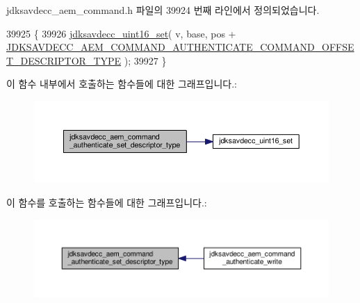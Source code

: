 jdksavdecc\+\_\+aem\+\_\+command.\+h 파일의 39924 번째 라인에서 정의되었습니다.


\begin{DoxyCode}
39925 \{
39926     \hyperlink{group__endian_ga14b9eeadc05f94334096c127c955a60b}{jdksavdecc\_uint16\_set}( v, base, pos + 
      \hyperlink{group__command__authenticate_gae59b6008707cccaab8f575f3e83dcea4}{JDKSAVDECC\_AEM\_COMMAND\_AUTHENTICATE\_COMMAND\_OFFSET\_DESCRIPTOR\_TYPE}
       );
39927 \}
\end{DoxyCode}


이 함수 내부에서 호출하는 함수들에 대한 그래프입니다.\+:
\nopagebreak
\begin{figure}[H]
\begin{center}
\leavevmode
\includegraphics[width=350pt]{group__command__authenticate_ga482382acdfff24eaf915502ce4d5ae75_cgraph}
\end{center}
\end{figure}




이 함수를 호출하는 함수들에 대한 그래프입니다.\+:
\nopagebreak
\begin{figure}[H]
\begin{center}
\leavevmode
\includegraphics[width=350pt]{group__command__authenticate_ga482382acdfff24eaf915502ce4d5ae75_icgraph}
\end{center}
\end{figure}


